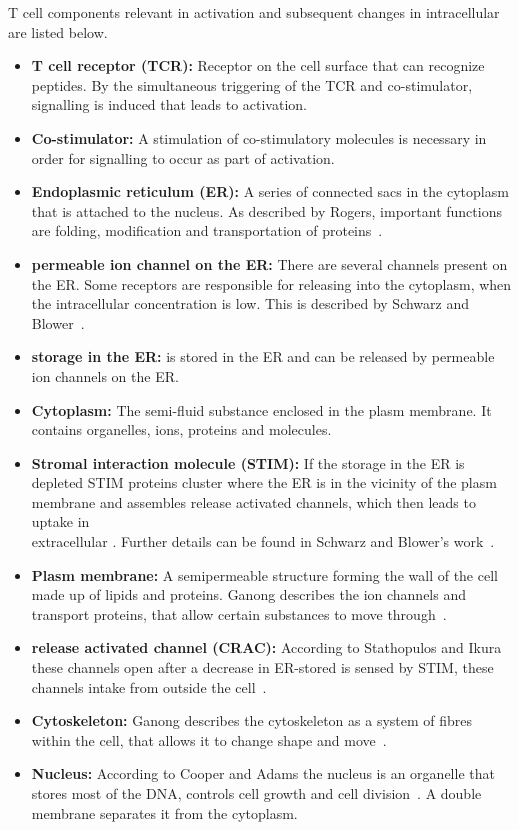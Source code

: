 T cell components relevant in activation and subsequent changes in intracellular \Calcium are listed below.

\begin{itemize}
	\item \textbf{T cell receptor (TCR):} Receptor on the cell surface that can recognize peptides. By the simultaneous triggering of the TCR and co-stimulator, signalling is induced that leads to activation.
	\item \textbf{Co-stimulator:} A stimulation of co-stimulatory molecules is necessary in order for signalling to occur as part of activation.
	\item \textbf{Endoplasmic reticulum (ER):} A series of connected sacs in the cytoplasm that is attached to the nucleus. As described by Rogers, important functions are folding, modification and transportation of proteins~\cite{Rogers2024}.
	\item \textbf{\Calcium permeable ion channel on the ER:} There are several \Calcium channels present on the ER. Some receptors are responsible for releasing \Calcium into the cytoplasm, when the intracellular \Calcium concentration is low. This is described by Schwarz and Blower~\cite{Schwarz2016}.
	\item \textbf{\Calcium storage in the ER:} \Calcium is stored in the ER and can be released by \Calcium permeable ion channels on the ER.
	\item \textbf{Cytoplasm:} The semi-fluid substance enclosed in the plasm membrane. It contains organelles, ions, proteins and molecules.
	\item \textbf{Stromal interaction molecule (STIM):} If the \Calcium storage in the ER is depleted STIM proteins cluster where the ER is in the vicinity of the plasm membrane and assembles \Calcium release activated \Calcium channels, which then leads to uptake in\\ extracellular \Calcium. Further details can be found in Schwarz and Blower's work~\cite{Schwarz2016}.
	\item \textbf{Plasm membrane:} A semipermeable structure forming the wall of the cell made up of lipids and proteins. Ganong describes the ion channels and transport proteins, that allow certain substances to move through~\cite{Ganong2012}.
	\item \textbf{\Calcium release activated \Calcium channel (CRAC):} According to Stathopulos and Ikura these channels open after a decrease in ER-stored \Calcium is sensed by STIM, these channels intake \Calcium from outside the cell~\cite{Stathopulos2013}.
	\item \textbf{Cytoskeleton:} Ganong describes the cytoskeleton as a system of fibres within the cell, that allows it to change shape and move~\cite{Ganong2012}.
	\item \textbf{Nucleus:} According to Cooper and Adams the nucleus is an organelle that stores most of the DNA, controls cell growth and cell division~\cite{cooper2022}. A double membrane separates it from the cytoplasm.
\end{itemize}

